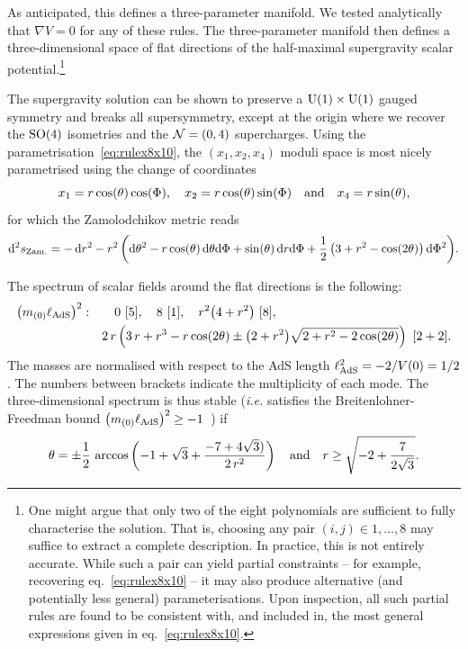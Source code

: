 \documentclass[11pt,a4paper]{article}
\renewcommand{\d}{\ensuremath{\mathrm{d}}\xspace}
\begin{document}
	As anticipated, this defines a three-parameter manifold. We tested analytically that $\nabla V = 0$ for any of these rules. The three-parameter manifold then defines a three-dimensional space of flat directions of the half-maximal supergravity scalar potential.\footnote{One might argue that only two of the eight polynomials are sufficient to fully characterise the solution. That is, choosing any pair $(i,j) \in {1, \dots, 8}$ may suffice to extract a complete description. In practice, this is not entirely accurate. While such a pair can yield partial constraints -- for example, recovering eq.~\eqref{eq:rulex8x10} -- it may also produce alternative (and potentially less general) parameterisations. Upon inspection, all such partial rules are found to be consistent with, and included in, the most general expressions given in eq.~\eqref{eq:rulex8x10}.}

	The supergravity solution can be shown to preserve a ${\rm U}(1)\times{\rm U}(1)$ gauged symmetry and breaks all supersymmetry, except at the origin where we recover the ${\rm SO}(4)$ isometries and the ${\cal N}=(0,4)$ supercharges. Using the parametrisation~\eqref{eq:rulex8x10}, the $(x_{1},x_{2},x_{4})$ moduli space is most nicely parametrised using the change of coordinates
	\begin{equation}
		x_{1} = r\cos(\theta)\cos(\Phi), \quad x_{2} = r\cos(\theta)\sin(\Phi) \quad {\rm and} \quad x_{4} = r\sin(\theta),
	\end{equation}
	for which the Zamolodchikov metric reads
	\begin{equation}
		\d^{2}s_{\rm Zam.} = -\,\d r^{2} - r^{2}\,\bigg(\d \theta^{2} - r\cos(\theta)\,\d \theta\d\Phi + \sin(\theta)\,\d r\d\Phi + \frac{1}{2}\,\big(3+r^{2}-\cos(2\theta)\big)\,\d\Phi^{2} \bigg).
	\end{equation}

	The spectrum of scalar fields around the flat directions is the following:
	\begin{equation}
		\begin{aligned}
			\big(m_{(0)}\ell_{\rm AdS}\big)^{2}: & \qquad 0 \ [5], \quad 8 \ [1], \quad r^{2}\big(4+r^{2}\big)\ [8],\\
			& \quad 2\,r\left(3\,r + r^{3} - r\cos(2\theta) \pm \big(2+r^{2}\big) \sqrt{2+r^{2}-2\cos(2\theta)} \right)\ [2+2].
		\end{aligned}
	\end{equation}
	The masses are normalised with respect to the AdS length $\ell_{\rm AdS}^{2} = -2/V(0) = 1/2$. The numbers between brackets indicate the multiplicity of each mode. The three-dimensional spectrum is thus stable (\textit{i.e.} satisfies the Breitenlohner-Freedman bound $\big(m_{(0)}\ell_{\rm AdS}\big)^{2}\geq -1$~\cite{Breitenlohner:1982jf}) if
	\begin{equation}
		\theta = \pm\frac{1}{2}\,\arccos\left(-1 + \sqrt{3} + \frac{- 7 + 4\sqrt{3})}{2\,r^2}\right) \quad {\rm and} \quad r \geq \sqrt{-2+\frac{7}{2\sqrt{3}}}.
	\end{equation}
\end{document}
